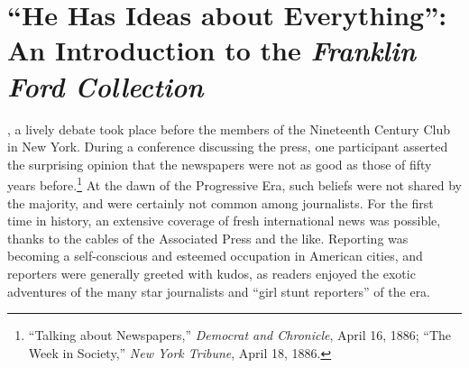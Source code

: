 \documentclass[openany,nobib]{tufte-book}
\let\oldchapter\chapter
\def\chapter{%
  \setcounter{footnote}{0}%
  \oldchapter
}
\begin{document}

\newpage
\thispagestyle{plain} %
\mbox{}


\begin{fullwidth}

\tableofcontents


\end{fullwidth}


\chapter[``He Has Ideas about Everything'': An Introduction to the \emph{Franklin Ford Collection}]{``He Has Ideas about Everything'':\\\noindent An Introduction to the \emph{Franklin \\\noindent Ford Collection}}
\label{ch:``He Has Ideas about Everything'': An Introduction to the Franklin Ford Collection}

\vspace{0.2in}

\begin{LARGE}
    


\end{LARGE}


\vspace{0.5in}



,  a lively debate took place before the members of the
Nineteenth Century Club in New York. During a conference discussing the
press, one participant asserted the surprising opinion that the
newspapers were not as good as those of fifty years before.\footnote{``Talking
  about Newspapers,'' \emph{Democrat and Chronicle}, April 16, 1886;
  ``The Week in Society,'' \emph{New York Tribune}, April 18, 1886.} At
the dawn of the Progressive Era, such beliefs were not shared by the
majority, and were certainly not common among journalists. For the first
time in history, an extensive coverage of fresh international news was
possible, thanks to the cables of the Associated Press and the like.
Reporting was becoming a self-conscious and esteemed occupation in
American cities, and reporters were generally greeted with kudos, as
readers enjoyed the exotic adventures of the many star journalists and
``girl stunt reporters'' of the era.
\end{document}
